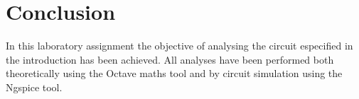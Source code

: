 \section{Conclusion}
\label{sec:conclusion}

In this laboratory assignment the objective of analysing the circuit especified in the introduction has been
achieved. All analyses have been performed both theoretically using the Octave maths tool and by circuit simulation using the
Ngspice tool. %
